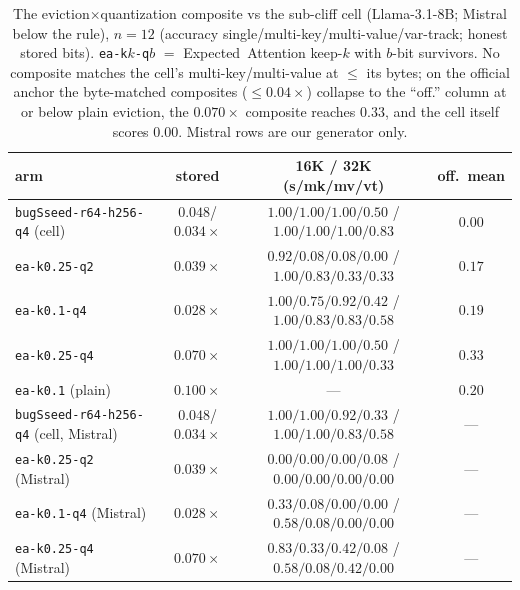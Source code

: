 \documentclass[11pt]{article}
\begin{document}
\begin{table}[t]
\centering
\caption{The eviction$\times$quantization composite vs the sub-cliff cell (Llama-3.1-8B;
Mistral below the rule), $n{=}12$ (accuracy single/multi-key/multi-value/var-track;
honest stored bits). \texttt{ea-k$k$-q$b$} $=$ Expected~Attention keep-$k$ with $b$-bit
survivors. No composite matches the cell's multi-key/multi-value at $\le$ its bytes; on
the official anchor the byte-matched composites ($\le0.04\times$) collapse to the
``off.'' column at or below plain eviction, the $0.070\times$ composite reaches
$0.33$, and the cell itself scores $0.00$. Mistral rows are our generator only.}
\label{tab:composite}
\small
\begin{tabular}{lccc}
\toprule
arm & stored & 16K \;/\; 32K (s/mk/mv/vt) & off.\ mean \\
\midrule
\texttt{bugSseed-r64-h256-q4} (cell) & $0.048$/$0.034\times$ & $1.00/1.00/1.00/0.50$ \;/\; $1.00/1.00/1.00/0.83$ & $0.00$ \\
\texttt{ea-k0.25-q2} & $0.039\times$ & $0.92/0.08/0.08/0.00$ \;/\; $1.00/0.83/0.33/0.33$ & $0.17$ \\
\texttt{ea-k0.1-q4}  & $0.028\times$ & $1.00/0.75/0.92/0.42$ \;/\; $1.00/0.83/0.83/0.58$ & $0.19$ \\
\texttt{ea-k0.25-q4} & $0.070\times$ & $1.00/1.00/1.00/0.50$ \;/\; $1.00/1.00/1.00/0.33$ & $0.33$ \\
\texttt{ea-k0.1} (plain) & $0.100\times$ & --- & $0.20$ \\
\midrule
\texttt{bugSseed-r64-h256-q4} (cell, Mistral) & $0.048$/$0.034\times$ & $1.00/1.00/0.92/0.33$ \;/\; $1.00/1.00/0.83/0.58$ & --- \\
\texttt{ea-k0.25-q2} (Mistral) & $0.039\times$ & $0.00/0.00/0.00/0.08$ \;/\; $0.00/0.00/0.00/0.00$ & --- \\
\texttt{ea-k0.1-q4} (Mistral)  & $0.028\times$ & $0.33/0.08/0.00/0.00$ \;/\; $0.58/0.08/0.00/0.00$ & --- \\
\texttt{ea-k0.25-q4} (Mistral) & $0.070\times$ & $0.83/0.33/0.42/0.08$ \;/\; $0.58/0.08/0.42/0.00$ & --- \\
\bottomrule
\end{tabular}
\end{table}
\end{document}
